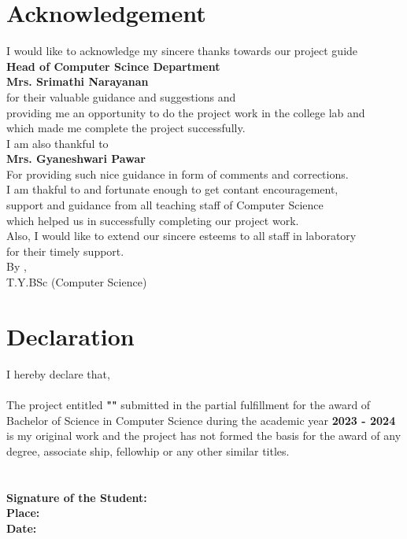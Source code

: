 \documentclass[12pt]{article}
\makeatletter
\let\inserttitle\@title
\let\insertauthor\@author
\makeatother
\begin{document}
\fontsize{12pt}{24pt}\selectfont

\section{Acknowledgement}
\begin{center}
	\vspace{2cm}
	I would like to acknowledge my sincere thanks towards our project guide \\
	\textbf{Head of Computer Scince Department} \\
	\textbf{Mrs. Srimathi Narayanan} \\
	for their valuable guidance and suggestions and \\
	providing me an opportunity to do the project work in the college lab and \\
	which made me complete the project successfully. \\
	\vspace{2cm}
	I am also thankful to \\
	\textbf{Mrs. Gyaneshwari Pawar} \\
	For providing such nice guidance in form of comments and corrections. \\
	I am thakful to and fortunate enough to get contant encouragement, \\
	support and guidance from all teaching staff of Computer Science \\
	which helped us in successfully completing our project work. \\
Also, I would like to extend our sincere esteems to all staff in laboratory \\
	for their timely support. \\
	\vspace{2cm}
	By \textbf{\insertauthor}, \\
	T.Y.BSc (Computer Science)
\end{center}


\section{Declaration}
\vspace{2cm}
I \textbf{\underline{\insertauthor}} hereby declare that, \\
\bigskip \\
The project entitled
\textbf{"\underline{\MakeUppercase{\inserttitle}}"}
submitted in the partial fulfillment for the award of Bachelor of Science in Computer Science during the academic year \textbf{2023 - 2024} is my original work and the project has not formed the basis for the award of any degree, associate ship, fellowhip or any other similar titles. \\ \\ \\
\vspace{2cm}
\textbf{Signature of the Student:} \\
\bigskip
\textbf{Place:} \\
\bigskip
\textbf{Date:} \\
\end{document}
